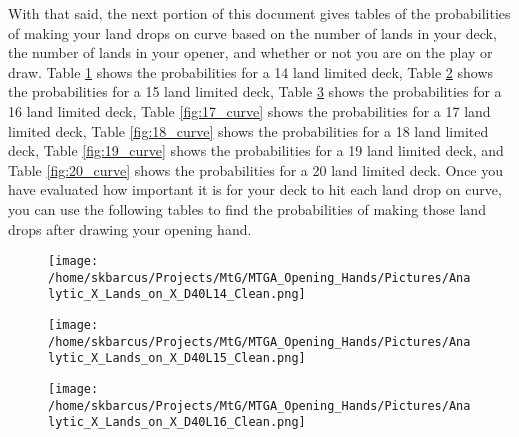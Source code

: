 \documentclass[oneside]{book}   %
\begin{document}
With that said, the next portion of this document gives tables of the probabilities of making your land drops on curve based on the number of lands in your deck, the number of lands in your opener, and whether or not you are on the play or draw. Table \ref{fig:14_curve} shows the probabilities for a 14 land limited deck, Table \ref{fig:15_curve} shows the probabilities for a 15 land limited deck, Table \ref{fig:16_curve} shows the probabilities for a 16 land limited deck, Table \ref{fig:17_curve} shows the probabilities for a 17 land limited deck, Table \ref{fig:18_curve} shows the probabilities for a 18 land limited deck, Table \ref{fig:19_curve} shows the probabilities for a 19 land limited deck, and Table \ref{fig:20_curve} shows the probabilities for a 20 land limited deck. Once you have evaluated how important it is for your deck to hit each land drop on curve, you can use the following tables to find the probabilities of making those land drops after drawing your opening hand. 

 	\begin{figure}[!ht]
	\centering
	\centerline{\texttt{[image: /home/skbarcus/Projects/MtG/MTGA\_Opening\_Hands/Pictures/Analytic\_X\_Lands\_on\_X\_D40L14\_Clean.png]}}
	\label{fig:14_curve}
	\end{figure}	
	
	\begin{figure}[!ht]
	\centering
	\centerline{\texttt{[image: /home/skbarcus/Projects/MtG/MTGA\_Opening\_Hands/Pictures/Analytic\_X\_Lands\_on\_X\_D40L15\_Clean.png]}}
	\label{fig:15_curve}
	\end{figure}	
	
	\begin{figure}[!ht]
	\centering
	\centerline{\texttt{[image: /home/skbarcus/Projects/MtG/MTGA\_Opening\_Hands/Pictures/Analytic\_X\_Lands\_on\_X\_D40L16\_Clean.png]}}
	\label{fig:16_curve}
	\end{figure}	
	
\end{document}
